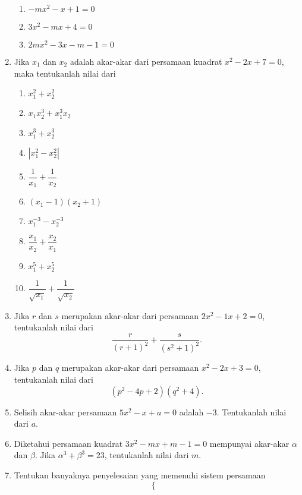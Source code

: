 \begin{enumerate}[nosep]
\begin{multcols}
\begin{enumerate}
					\item $ -mx^{2} - x + 1 = 0 $
					\item $ 3x^{2} - mx + 4 = 0 $
					\item $ 2mx^{2} - 3x - m - 1 = 0 $
				\end{enumerate}
			\end{multcols}
			\item Jika $ x_{1} $ dan $ x_{2} $ adalah akar-akar dari persamaan kuadrat $ x^{2} - 2x + 7 = 0 $, maka tentukanlah nilai dari
			\begin{multcols}
				\begin{enumerate}
					\item $ x_{1}^{2} + x_{2}^{2} $
					\item $ x_{1}x_{2}^{3} + x_{1}^{3}x_{2} $
					\item $ x_{1}^{3} + x_{2}^{3} $
					\item $ \left|x_{1}^{2} - x_{2}^{2}\right| $
					\item $ \dfrac{1}{x_{1}} + \dfrac{1}{x_{2}} $
					\item $ \left(x_{1} - 1\right)\left(x_{2} + 1\right) $
					\item $ x_{1}^{-3} - x_{2}^{-3} $
					\item $ \dfrac{x_{1}}{x_{2}} + \dfrac{x_{2}}{x_{1}} $
					\item $ x_{1}^{5} + x_{2}^{5} $
					\item $ \dfrac{1}{\sqrt{x_{1}}} + \dfrac{1}{\sqrt{x_{2}}} $
				\end{enumerate}
			\end{multcols}
			\item Jika $ r $ dan $ s $ merupakan akar-akar dari persamaan $ 2x^{2} - 1x + 2 = 0 $, tentukanlah nilai dari
			\[ \frac{r}{\left(r + 1\right)^{2}} + \frac{s}{\left(s^{2} + 1\right)^{2}}. \]
			\item Jika $ p $ dan $ q $ merupakan akar-akar dari persamaan $ x^{2} - 2x + 3 = 0 $, tentukanlah nilai dari
			\[ \left(p^{2} - 4p + 2\right)\left(q^{2} + 4\right). \]
			\item Selisih akar-akar persamaan $ 5x^{2} - x + a = 0 $ adalah $ -3 $. Tentukanlah nilai dari $ a $.
			\item Diketahui persamaan kuadrat $ 3x^{2} - mx + m - 1 = 0 $ mempunyai akar-akar $ \alpha $ dan $ \beta $. Jika $ \alpha^{3} + \beta^{3} = 23 $, tentukanlah nilai dari $ m $.
			\item Tentukan banyaknya penyelesaian yang memenuhi sistem persamaan
			\[
				\begin{cases}

\end{cases}\]
\end{enumerate}

